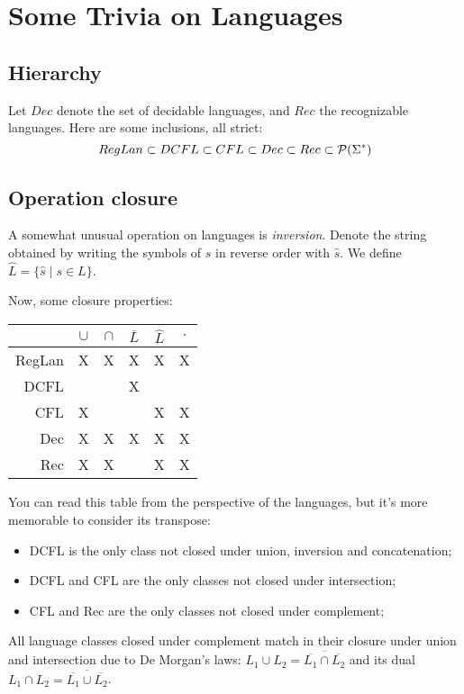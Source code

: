 \section{Some Trivia on Languages}
\subsection{Hierarchy}
Let $Dec$ denote the set of decidable languages, and $Rec$ the
recognizable languages. Here are some inclusions, all strict:
\begin{equation*}
	RegLan \subset DCFL \subset CFL \subset Dec \subset Rec \subset {\cal P}(\Sigma^*)
\end{equation*}

\subsection{Operation closure}
A somewhat unusual operation on languages is \emph{inversion}. Denote the string obtained by writing the symbols of $s$ in reverse order with $\hat{s}$. We define $\widehat{L} = \{\hat{s}\mid s \in L\}$.

Now, some closure properties:
\begin{center}
\begin{tabular}{r|ccccc}
	   & $\cup$ & $\cap$ & $\overline{L}$ &  $\widehat{L}$ & $\cdot$\\\hline
RegLan & X & X & X & X & X\\
DCFL   &   &   & X &   &  \\
CFL    & X &   &   & X & X\\
Dec    & X & X & X & X & X\\
Rec    & X & X &   & X & X\\
\end{tabular}
\end{center}
You can read this table from the perspective of the languages, but it's more memorable to consider its transpose:
\begin{itemize}
	\item DCFL is the only class not closed under union, inversion and concatenation;
	\item DCFL and CFL are the only classes not closed under intersection;
	\item CFL and Rec are the only classes not closed under complement;
\end{itemize}
All language classes closed under complement match in their closure under union and intersection due to De Morgan's laws: $L_1 \cup L_2 = \overline{\overline{L_1} \cap \overline{L_2}}$ and its dual $L_1 \cap L_2 = \overline{\overline{L_1} \cup \overline{L_2}}$.

